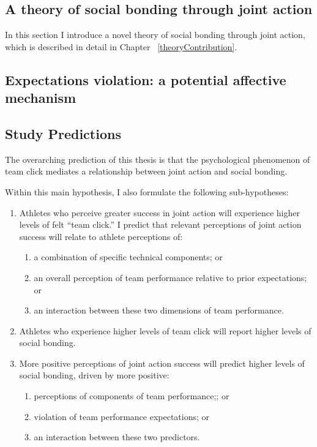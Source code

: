 \begin{CJK}{UTF8}{gbsn}
\section{A theory of social bonding through joint action}

In this section I introduce a novel theory of social bonding through joint action, which is described in detail in Chapter ~\ref{theoryContribution}.

\subsection{Expectations violation: a potential affective mechanism}


\subsection{Study Predictions}


    The overarching prediction of this thesis is that the psychological phenomenon of team click mediates a relationship between joint action and social bonding.

    Within this main hypothesis, I also formulate the following sub-hypotheses:
    \begin{enumerate}
      \item Athletes who perceive greater success in joint action will experience higher levels of felt ``team click.'' I predict that relevant perceptions of joint action success will relate to athlete perceptions of:
        \begin{enumerate}
          \item a combination of specific technical components; or
          \item an overall perception of team performance relative to prior expectations; or
          \item an interaction between these two dimensions of team performance.
        \end{enumerate}
      \item Athletes who experience higher levels of team click will report higher levels of social bonding.
      \item More positive perceptions of joint action success will predict higher levels of social bonding, driven by more positive:
      \begin{enumerate}
        \item perceptions of components of team performance;; or
        \item violation of team performance expectations; or
        \item an interaction between these two predictors.
      \end{enumerate}
    \end{enumerate}



\end{CJK}
